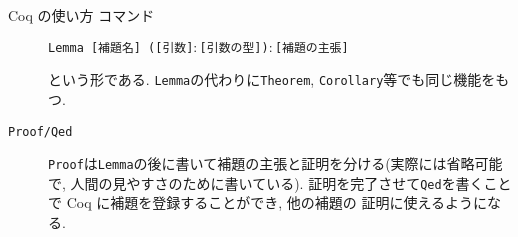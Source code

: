 \documentclass[dvipdfmx,cjk]{beamer}
\theoremstyle{mystyle}
\newcommand{\0}{\textbf{0}}
\begin{document}
\begin{frame}{Coq の使い方 コマンド}
\begin{description}
    {\tt Lemma [補題名] ([引数]$\colon$[引数の型])$\colon$[補題の主張]}
    
    という形である. 
%    
    {\tt Lemma}の代わりに{\tt Theorem}, {\tt Corollary}等でも同じ機能をもつ. 
  \item[\tt Proof/Qed]
    {\tt Proof}は{\tt Lemma}の後に書いて補題の主張と証明を分ける(実際には省略可能で, 
    人間の見やすさのために書いている). 
    証明を完了させて{\tt Qed}を書くことで Coq に補題を登録することができ, 他の補題の
    証明に使えるようになる. 
\end{description}
\end{frame}
\end{document}
